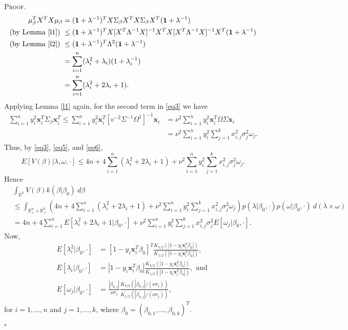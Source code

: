 \documentclass[12pt]{article}
\newcounter{ProofCounter}
\newenvironment{Proof}{\stepcounter{ProofCounter}\textsc{Proof.}}{\hfill$\square$}
\begin{document}
\begin{Proof}
  \begin{align}
    \mu_{\beta}^T X^T X \mu_{\beta} & = (\bm{1} + \lambda^{-1})^T X \Sigma_{\beta}X^T X\Sigma_{\beta} X^T (\bm{1} + \lambda^{-1}) \nonumber \\
    \text{(by Lemma \ref{l1})}\ & \leq (\bm{1} + \lambda^{-1})^T X[X^T\Lambda^{-1}X]^{-1}X^T X[X^T\Lambda^{-1}X]^{-1}X^T (\bm{1} + \lambda^{-1}) \nonumber \\
    \text{(by Lemma \ref{l2})}\ & \leq (\bm{1} + \lambda^{-1})^T \Lambda^{2} (\bm{1} + \lambda^{-1})\nonumber \\
    & = \sum_{i=1}^{n}(\lambda_i^2 + \lambda_i)(1 + \lambda_i^{-1}) \nonumber \\
    & = \sum_{i=1}^{n}(\lambda_i^2 + 2\lambda_i + 1).
    \label{eq5}
  \end{align}
  Applying Lemma \ref{l1} again, for the second term in \eqref{eq3} we have 
  \begin{align}
    \sum_{i=1}^{n}y_i^2 \bm{x}_i^T\Sigma_{\beta} \bm{x}_i^T \leq \sum_{i=1}^{n}y_i^2 \bm{x}_i^T[v^{-2}\Sigma^{-1}\Omega^{1}]^{-1}\bm{x}_i & = \nu^2\sum_{i=1}^{n} y_i^2
    \bm{x}_i^T \Omega \Sigma \bm{x}_i \nonumber \\
    & = \nu^2 \sum_{i=1}^{n}y_i^2 \sum_{j=1}^{k}x_{i,j}^2 \sigma_{j}^2 \omega_j.
    \label{eq6}
  \end{align}
  Thus, by \eqref{eq3}, \eqref{eq5}, and \eqref{eq6}, 
  \[
    E[V(\beta)|\lambda, \omega, \cdot] \leq 4n + 4\sum_{i=1}^{n}(\lambda_i^2 + 2\lambda_i + 1) + \nu^2 \sum_{i=1}^{n}y_i^2 \sum_{j=1}^{k}x_{i,j}^2
    \sigma_j^2 \omega_j.
  \]
  Hence 
  \begin{align}
    & \int_{\mathbb{R}^{k}} V(\beta) k(\beta|\beta_0)\ d\beta \nonumber \\
    & \leq \int_{\mathbb{R}^{n}_+ \times \mathbb{R}^{k}_+}
    \left(4n + 4\sum_{i=1}^{n}(\lambda_i^2 + 2\lambda_i + 1) + \nu^2 \sum_{i=1}^{n}y_i^2 \sum_{j=1}^{k}x_{i,j}^2 \sigma_j^2 \omega_j \right)
    p(\lambda|\beta_0, \cdot) p(\omega|\beta_0,\cdot)\ d(\lambda \times \omega) \nonumber \\
    & = 4n + 4\sum_{i=1}^{n}E[\lambda_i^2 + 2\lambda_i + 1|\beta_0, \cdot] + \nu^2\sum_{i=1}^{n}y_i^2\sum_{j=1}^{k}x_{i,j}^2\sigma_j^2
    E[\omega_j|\beta_0,\cdot].
    \label{eq7}
  \end{align}
  Now,
  \begin{align*}
    E[\lambda_i^2|\beta_0, \cdot] & = [1 - y_i\bm{x}_i^T\beta_0]^2 \frac{K_{5/2}\left( |1 - y_i\bm{x}_i^T\beta_0| \right)}{K_{1/2}\left( |1 - y_i\bm{x}_i^T\beta_0|
    \right)}, \\
    E[\lambda_i|\beta_0, \cdot] & = |1 - y_i\bm{x}_i^T\beta_0| \frac{K_{3/2}\left( |1 - y_i\bm{x}_i^T\beta_0| \right)}{K_{1/2}\left( |1 - y_i\bm{x}_i^T\beta_0|
    \right)}, \text{ and } \\
    E[\omega_j|\beta_0, \cdot] & = \frac{|\beta_{0,j}|}{\nu\sigma_j} \frac{K_{3/2}\left( |\beta_{0,j}| / (\nu\sigma_j) \right)}{ 
    K_{1/2}\left( |\beta_{0,j}| / (\nu \sigma_{j}) \right)},
  \end{align*}
  for $i = 1,\dots, n$ and $j = 1,\dots,k$, where $\beta_0 = (\beta_{0,1}, \dots, \beta_{0,k})^T$.


\end{Proof}
\end{document}

